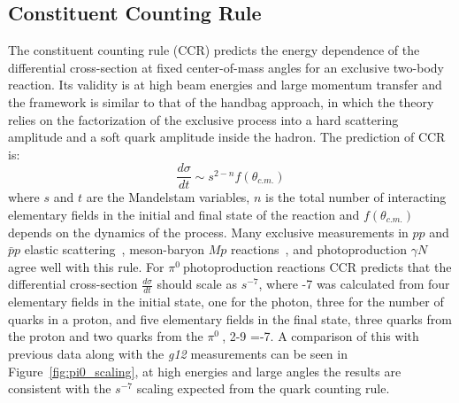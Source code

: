 \documentclass{aip-cp}
\def\g12{\emph{g12}}
\def\piz{$\pi^{0}\ $}
\begin{document}
\subsection{Constituent Counting Rule}
The constituent counting rule (CCR) predicts the energy dependence of the differential cross-section at fixed center-of-mass angles for an exclusive two-body reaction. Its validity is at high beam energies and large momentum transfer and the framework is similar to that of the handbag approach, in which the theory relies on the factorization of the exclusive process into a hard scattering amplitude and a soft quark amplitude inside the hadron. The prediction of CCR is:
\begin{equation}
\frac{d\sigma}{dt} \sim s^{2-n}f(\theta_{c.m.}) \label{CCR}
\end{equation}
where $s$ and $t$ are the Mandelstam variables, $n$ is the total number of interacting elementary fields in the initial and final state of the reaction and $f(\theta_{c.m.})$ depends on the dynamics of the process. Many exclusive measurements in $pp$ and  $\bar{p}p$ elastic scattering~\cite{scalingexp5, scalingexp7}, meson-baryon $M p$ reactions~\cite{scalingexp7}, and photoproduction $\gamma N$~\cite{scalingexp2, scalingexp3, scalingexp4, scalingexp6, scalingexp8, scalingexp9, scalingexp10, scalingexp11} agree well with this rule. For \piz photoproduction reactions CCR predicts that the differential cross-section $\frac{d\sigma}{dt}$ should scale as $s^{-7}$, where -7 was calculated from four elementary fields in the initial state, one for the photon, three for the number of quarks in a proton, and five elementary fields in the final state, three quarks from the proton and two quarks from the \piz, 2-9 =-7. A comparison of this with previous data along with the \g12 measurements can be seen in Figure~\ref{fig:pi0_scaling}, at high energies and large angles the results are consistent with the $s^{−7}$ scaling expected from the quark counting rule. 
\end{document}

